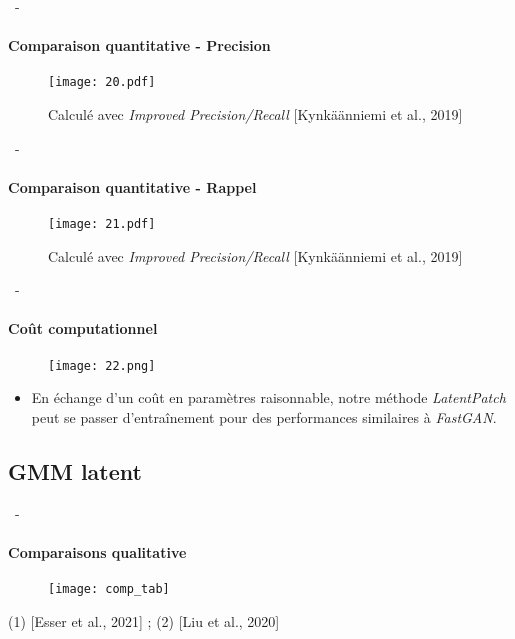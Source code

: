 \documentclass[aspectratio=169, 22pt]{beamer}
\begin{document}
\begin{frame}[noframenumbering]{\secname~- \subsecname}
  \framesubtitle{Comparaison quantitative - Precision}
  \begin{figure}
    \texttt{[image: 20.pdf]}
    \caption{\small Calculé avec \emph{Improved Precision/Recall} [Kynkäänniemi et al., 2019]}
  \end{figure}
\end{frame}

\begin{frame}[noframenumbering]{\secname~- \subsecname}
  \framesubtitle{Comparaison quantitative - Rappel}
  \begin{figure}
    \texttt{[image: 21.pdf]}
    \caption{\small Calculé avec \emph{Improved Precision/Recall} [Kynkäänniemi et al., 2019]}
  \end{figure}
\end{frame}
 
\begin{frame}[noframenumbering]{\secname~- \subsecname}
  \framesubtitle{Coût computationnel}
  \begin{figure}
    \texttt{[image: 22.png]}
  \end{figure}
  \begin{itemize}
  \item En échange d'un coût en paramètres raisonnable, notre méthode
    \emph{LatentPatch} peut se passer d'entraînement pour des performances
    similaires à \emph{FastGAN}.
  \end{itemize}
\end{frame}

\subsection{GMM latent}
\begin{frame}[noframenumbering]{\secname~- \subsecname}
  \framesubtitle{Comparaisons qualitative}
  \begin{figure}
    \texttt{[image: comp\_tab]}
  \end{figure}
  \scriptsize (1) [Esser et al., 2021] ; (2) [Liu et al., 2020]
\end{frame}
\end{document}
